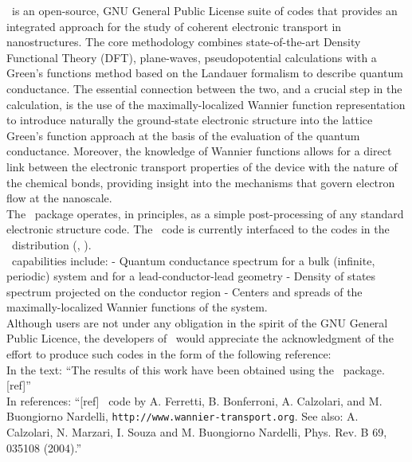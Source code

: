  \WANT\ is an open-source, GNU
General Public License suite of codes that provides an integrated
approach for the study of coherent electronic transport in
nanostructures. The core methodology combines state-of-the-art
Density Functional Theory (DFT), plane-waves, pseudopotential
calculations with a Green's functions method based on the Landauer
formalism to describe quantum conductance. The essential
connection between the two, and a crucial step in the calculation,
is the use of the maximally-localized Wannier function
representation to introduce naturally the ground-state electronic
structure into the lattice Green's function approach at the basis
of the evaluation of the quantum conductance. Moreover, the
knowledge of Wannier functions allows for a
direct link between the electronic transport properties of the
device with the nature of the chemical bonds, providing insight
into the mechanisms that govern electron flow at the nanoscale.\\

\noindent The \WANT\ package operates, in principles, as a simple
post-processing of any standard electronic structure code. The \WANT\ code
is currently interfaced to the codes in the \QUANTUMESPRESSO\ distribution
(\QUANTUMESPRESSOURL, \PWSCFURL).\\

\noindent \WANT\ capabilities include:
- Quantum conductance spectrum for a bulk (infinite, periodic)
system and for a lead-conductor-lead geometry - Density of states
spectrum projected on the conductor region - Centers and spreads of the
maximally-localized Wannier functions of the system.\\

\newpage
{} Although users are not under any
obligation in the spirit of the GNU General Public Licence, the
developers of \WANT\ would appreciate the acknowledgment of the
effort to produce such codes in the form of the following
reference:\\

\noindent In the text: ``The results of this work have been
obtained using the \WANT\ package.[ref]''\\

\noindent In references: ``[ref] \WANT\ code by A. Ferretti, B. Bonferroni, A. Calzolari, 
and M. Buongiorno Nardelli, \texttt{http://www.wannier-transport.org}. 
See also: A. Calzolari, N. Marzari,
I. Souza and M. Buongiorno Nardelli, Phys. Rev. B 69, 035108 (2004).''\\
  \vspace{0.25in}

